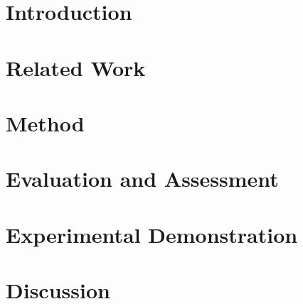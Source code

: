 \documentclass[runningheads]{llncs}
\begin{document}
\section{Introduction}
\label{sec:intro}


\section{Related Work}
\label{sec:related}


\section{Method}
\label{sec:method}


\section{Evaluation and Assessment}
\label{sec:evaluation}


\section{Experimental Demonstration}
\label{sec:prototype}


\section{Discussion}
\label{sec:discussion}


\clearpage
%
%


\end{document}

